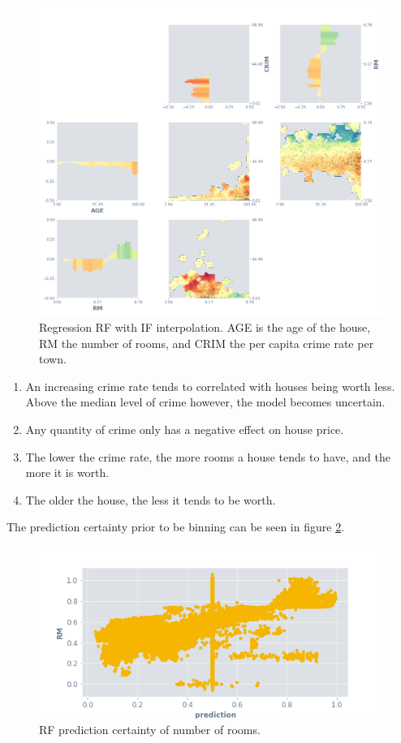 \documentclass[a4paper, twocolumn]{article}
\begin{document}
\begin{figure}
\centering
\includegraphics[width=\columnwidth]{img/reg_rf_if_matrix.png}
\caption{Regression RF with IF interpolation. AGE is the age of the house, RM the number of rooms, and CRIM the per capita crime rate per town.}
\label{fig:reg-rf-if-matrix}
\end{figure}

\begin{enumerate}
\item An increasing crime rate tends to correlated with houses being worth less. Above the median level of crime however, the model becomes uncertain.
\item Any quantity of crime only has a negative effect on house price.
\item The lower the crime rate, the more rooms a house tends to have, and the more it is worth.
\item The older the house, the less it tends to be worth.
\end{enumerate}

The prediction certainty prior to be binning can be seen in figure \ref{fig:reg-rf-if-rm}.

\begin{figure}
\centering
\includegraphics[width=0.7\columnwidth]{img/reg_rf_if_rm.png}
\caption{RF prediction certainty of number of rooms.}
\label{fig:reg-rf-if-rm}
\end{figure}
\end{document}
